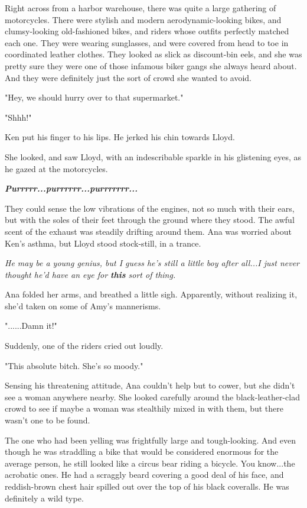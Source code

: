 \documentclass[
]{article}
\begin{document}
Right across from a harbor warehouse, there was quite a large gathering
of motorcycles. There were stylish and modern aerodynamic-looking bikes,
and clumsy-looking old-fashioned bikes, and riders whose outfits
perfectly matched each one. They were wearing sunglasses, and were
covered from head to toe in coordinated leather clothes. They looked as
slick as discount-bin eels, and she was pretty sure they were one of
those infamous biker gangs she always heard about. And they were
definitely just the sort of crowd she wanted to avoid.

"Hey, we should hurry over to that supermarket."

"Shhh!"

Ken put his finger to his lips. He jerked his chin towards Lloyd.

She looked, and saw Lloyd, with an indescribable sparkle in his
glistening eyes, as he gazed at the motorcycles.

\emph{\textbf{Purrrrr...purrrrrr...purrrrrrr...}}

They could sense the low vibrations of the engines, not so much with
their ears, but with the soles of their feet through the ground where
they stood. The awful scent of the exhaust was steadily drifting around
them. Ana was worried about Ken's asthma, but Lloyd stood stock-still,
in a trance.

\emph{He may be a young genius, but I guess he's still a little boy
after all...I just never thought he'd have an eye for \textbf{this} sort
of thing.}

Ana folded her arms, and breathed a little sigh. Apparently, without
realizing it, she'd taken on some of Amy's mannerisms.

"......Damn it!"

Suddenly, one of the riders cried out loudly.

"This absolute bitch. She's so moody."

Sensing his threatening attitude, Ana couldn't help but to cower, but
she didn't see a woman anywhere nearby. She looked carefully around the
black-leather-clad crowd to see if maybe a woman was stealthily mixed in
with them, but there wasn't one to be found.

The one who had been yelling was frightfully large and tough-looking.
And even though he was straddling a bike that would be considered
enormous for the average person, he still looked like a circus bear
riding a bicycle. You know...the acrobatic ones. He had a scraggly beard
covering a good deal of his face, and reddish-brown chest hair spilled
out over the top of his black coveralls. He was definitely a wild type.
\end{document}
